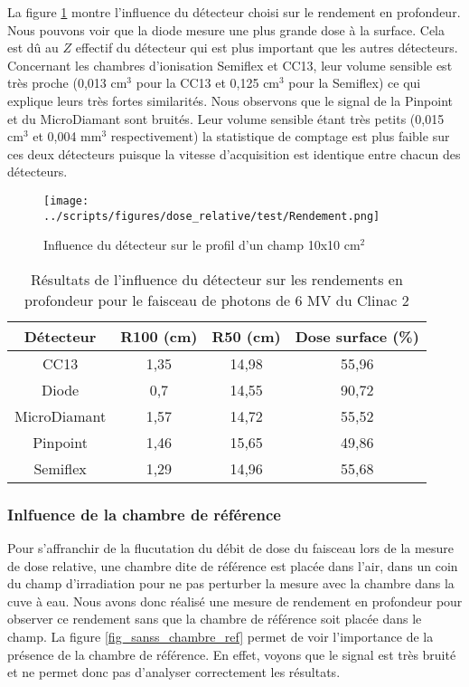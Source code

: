 \documentclass{article}
\begin{document}
La figure \ref*{fig_rdt_detecteurs} montre l'influence du détecteur choisi sur le rendement en profondeur. Nous pouvons voir que la diode mesure une plus grande dose à la surface. Cela est dû au $Z$ effectif du détecteur qui est plus important que les autres détecteurs. Concernant les chambres d'ionisation Semiflex et CC13, leur volume sensible est très proche (0,013 cm$^3$ pour la CC13 et 0,125 cm$^3$ pour la Semiflex) ce qui explique leurs très fortes similarités. Nous observons que le signal de la Pinpoint et du MicroDiamant sont bruités. Leur volume sensible étant très petits (0,015 cm$^3$ et 0,004 mm$^3$ respectivement) la statistique de comptage est plus faible sur ces deux détecteurs puisque la vitesse d'acquisition est identique entre chacun des détecteurs.

\begin{figure}[h]
  \centering
  \texttt{[image: ../scripts/figures/dose\_relative/test/Rendement.png]}
  \caption{Influence du détecteur sur le profil d'un champ 10x10 cm$^2$}
  \label{fig_rdt_detecteurs}
\end{figure}

\begin{table}[h]
  \centering
  \begin{tabular}{cccc}
    \toprule
    \textbf{Détecteur} & \textbf{R100 (cm)} & \textbf{R50 (cm)} & \textbf{Dose surface (\%)} \\
    \toprule
    CC13 & 1,35 & 14,98 & 55,96 \\
    Diode & 0,7 & 14,55 & 90,72 \\
    MicroDiamant & 1,57 & 14,72 & 55,52 \\
    Pinpoint & 1,46 & 15,65 & 49,86 \\
    Semiflex & 1,29 & 14,96 & 55,68 \\
    \bottomrule
  \end{tabular}
  \caption{Résultats de l'influence du détecteur sur les rendements en profondeur pour le faisceau de photons de 6 MV du Clinac 2}
  \label{table_rdt_detecteurs}
\end{table}

\newpage
\subsubsection{Inlfuence de la chambre de référence}

Pour s'affranchir de la flucutation du débit de dose du faisceau lors de la mesure de dose relative, une chambre dite de référence est placée dans l'air, dans un coin du champ d'irradiation pour ne pas perturber la mesure avec la chambre dans la cuve à eau. Nous avons donc réalisé une mesure de rendement en profondeur pour observer ce rendement sans que la chambre de référence soit placée dans le champ. La figure \ref*{fig_sanss_chambre_ref} permet de voir l'importance de la présence de la chambre de référence. En effet, voyons que le signal est très bruité et ne permet donc pas d'analyser correctement les résultats.
\end{document}
